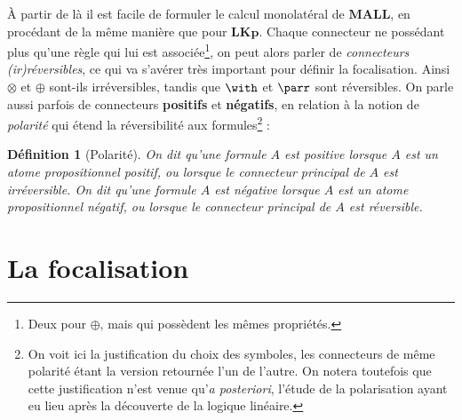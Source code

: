 \documentclass[12pt]{report}
\newtheorem{definition}{Définition}
\begin{document}
À partir de là il est facile de formuler le calcul monolatéral de $\mathbf{MALL}$, en procédant de la même manière que pour $\mathbf{LKp}$. Chaque connecteur ne possédant plus qu'une règle qui lui est associée\footnote{Deux pour $\oplus$, mais qui possèdent les mêmes propriétés.}, on peut alors parler de \emph{connecteurs (ir)réversibles}, ce qui va s'avérer très important pour définir la focalisation. Ainsi $\otimes$ et $\oplus$ sont-ils irréversibles, tandis que $\with$ et $\parr$ sont réversibles. On parle aussi parfois de connecteurs \textbf{positifs} et \textbf{négatifs}, en relation à la notion de \emph{polarité} qui étend la réversibilité aux formules\footnote{On voit ici la justification du choix des symboles, les connecteurs de même polarité étant la version retournée l'un de l'autre. On notera toutefois que cette justification n'est venue qu'\textit{a posteriori}, l'étude de la polarisation ayant eu lieu après la découverte de la logique linéaire.} :

\begin{definition}[Polarité]
	On dit qu'une formule $A$ est \emph{positive} lorsque $A$ est un atome propositionnel positif, ou lorsque le connecteur principal de $A$ est irréversible.
	On dit qu'une formule $A$ est \emph{négative} lorsque $A$ est un atome propositionnel négatif, ou lorsque le connecteur principal de $A$ est réversible.
\end{definition}

\chapter*{La focalisation}
\end{document}
